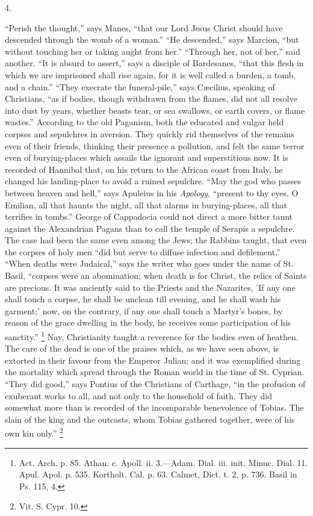 4.

``Perish the thought,'' says Manes, ``that our Lord
Jesus Christ should have descended through the womb of a woman.''
``He descended,'' says Marcion, ``but without touching her
or taking aught from her.'' ``Through her, not of her,''
said another. ``It is absurd to assert,'' says a disciple of
Bardesanes, ``that this flesh in which we are imprisoned shall
rise again, for it is well called a burden, a tomb, and a chain.''
``They execrate the funeral-pile,'' says Cæcilius, speaking
of Christians, ``as if bodies, though withdrawn from the flames,
did not all resolve into dust by years, whether beasts tear, or sea
swallows, or earth covers, or flame wastes.'' According to the old
Paganism, both the educated and vulgar held corpses and sepulchres in
aversion. They quickly rid themselves of the remains even of their
friends, thinking their presence a pollution, and felt the same terror
even of burying-places which assails the ignorant and superstitious
now. It is recorded of Hannibal that, on his return to the African
coast from Italy, he changed his landing-place to avoid a ruined
sepulchre. ``May the god who passes between heaven and hell,''
says Apuleius in his \emph{Apology}, ``present to thy eyes, O
Emilian, all that haunts the night, all that alarms in burying-places,
all that terrifies in tombs.'' George of Cappadocia could not
direct a more bitter taunt against the Alexandrian Pagans than to call
the temple of Serapis a sepulchre. The case had been the same even
among the Jews; the Rabbins taught, that even the corpses of holy men
``did but serve to diffuse infection and defilement.''
``When deaths were Judaical,'' says the writer who goes under
the name of St. Basil, ``corpses were an abomination; when death
is for Christ, the relics of Saints are precious. It was anciently
said to the Priests and the Nazarites, 'If any one shall touch a
corpse, he shall be unclean till evening, and he shall wash his
garment;' now, on the contrary, if any one shall touch a Martyr's
bones, by reason of the grace dwelling in the body, he receives some
participation of his sanctity.'' \footnote{Act. Arch. p. 85. Athan. c. Apoll. ii. 3.—Adam. Dial. iii.
init. Minuc. Dial. 11. Apul. Apol. p. 535. Kortholt. Cal. p. 63.
Calmet, Dict. t. 2, p. 736. Basil in Ps. 115, 4.} Nay, Christianity taught a reverence for the bodies even of
heathen. The care of the dead is one of the praises which, as we have
seen above, is extorted in their favour from the Emperor Julian; and
it was exemplified during the mortality which spread through the Roman
world in the time of St. Cyprian. ``They did good,'' says
Pontius of the Christians of Carthage, ``in the profusion of
exuberant works to all, and not only to the household of faith. They
did somewhat more than is recorded of the incomparable benevolence of
Tobias. The slain of the king and the outcasts, whom Tobias gathered
together, were of his own kin only.'' \footnote{Vit. S. Cypr. 10.}

